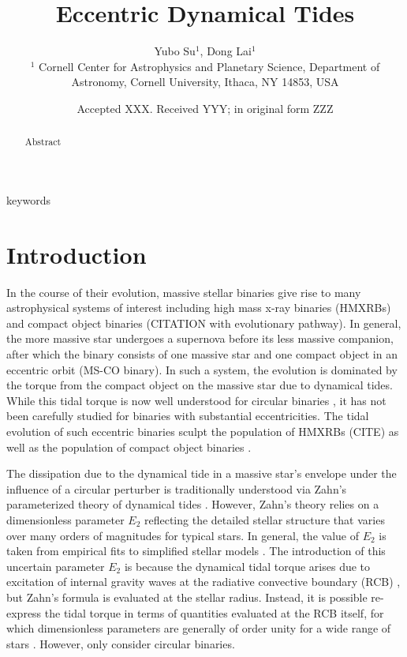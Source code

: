 \documentclass[
        fleqn,
        usenatbib,
    ]{mnras}
\title[Eccentric Dynamical Tides]{Eccentric Dynamical Tides}
\author[Y. Su, D. Lai.]{
Yubo Su$^1$,
Dong Lai$^1$
\\
$^1$ Cornell Center for Astrophysics and Planetary Science, Department of
Astronomy, Cornell University, Ithaca, NY 14853, USA
}
\date{Accepted XXX\@. Received YYY\@; in original form ZZZ}
\begin{document}
\label{firstpage}
\pagerange{\pageref{firstpage}--\pageref{lastpage}}
\maketitle

\begin{abstract}
    Abstract
\end{abstract}

\begin{keywords}
keywords %
\end{keywords}

\section{Introduction}

In the course of their evolution, massive stellar binaries give rise to many
astrophysical systems of interest including high mass x-ray binaries (HMXRBs)
and compact object binaries (CITATION with evolutionary pathway). In general,
the more massive star undergoes a supernova before its less massive companion,
after which the binary consists of one massive star and one compact object in an
eccentric orbit (MS-CO binary). In such a system, the evolution is dominated by
the torque from the compact object on the massive star due to dynamical tides.
While this tidal torque is now well understood for circular binaries
\citep{kushnir}, it has not been carefully studied for binaries with substantial
eccentricities. The tidal evolution of such eccentric binaries sculpt the
population of HMXRBs (CITE) as well as the population of compact object binaries
\citep{vigna2020common}.

The dissipation due to the dynamical tide in a massive star's envelope under the
influence of a circular perturber is traditionally understood via Zahn's
parameterized theory of dynamical tides \citep{zahn1975dynamical}. However,
Zahn's theory relies on a dimensionless parameter $E_2$ reflecting the detailed
stellar structure that varies over many orders of magnitudes for typical stars.
In general, the value of $E_2$ is taken from empirical fits to simplified
stellar models \citep{hurley2002evolution, vigna2020common}. The introduction of
this uncertain parameter $E_2$ is because the dynamical tidal torque arises due
to excitation of internal gravity waves at the radiative convective boundary
(RCB) \citep{goldreich1989tidal, savonije1983tidal}, but Zahn's formula is
evaluated at the stellar radius. Instead, it is possible re-express the tidal
torque in terms of quantities evaluated at the RCB itself, for which
dimensionless parameters are generally of order unity for a wide range of stars
\citep{kushnir}. However, \citet{kushnir} only consider circular binaries.
\end{document}
